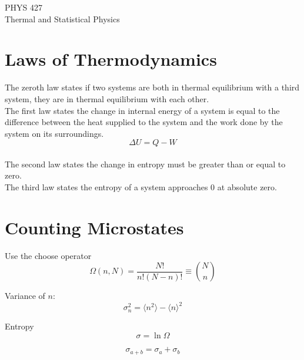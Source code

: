 \documentclass[11pt]{article}
\begin{document}
\begin{center}
{\LARGE {PHYS 427}} \\ \vspace{5pt}
{\LARGE {Thermal and Statistical Physics}} \\ \vspace{5pt}
\end{center}

\tableofcontents
\clearpage

\section{Laws of Thermodynamics}
The zeroth law states if two systems are both in thermal equilibrium with a third system, they are in thermal equilibrium with each other. \\

The first law states the change in internal energy of a system is equal to the difference between the heat supplied to the system and the work done by the system on its surroundings.
\begin{equation}
    \Delta U = Q - W
\end{equation} \\

The second law states the change in entropy must be greater than or equal to zero. \\

The third law states the entropy of a system approaches 0 at absolute zero.


\section{Counting Microstates}
Use the choose operator
\newcommand{\Nchoosen}{\begin{equation}
    \Omega(n, N) = \frac{N!}{n! (N - n)!} \equiv \binom{N}{n}
\end{equation}}
\Nchoosen

Variance of $n$:
\begin{equation}
    \sigma_n^2 = \langle n^2 \rangle - \langle n \rangle ^2
\end{equation}

Entropy
\begin{equation}
    \sigma = \ln \Omega
\end{equation}

\begin{equation}
    \sigma_{a + b} = \sigma_a + \sigma_b 
\end{equation}
\end{document}
